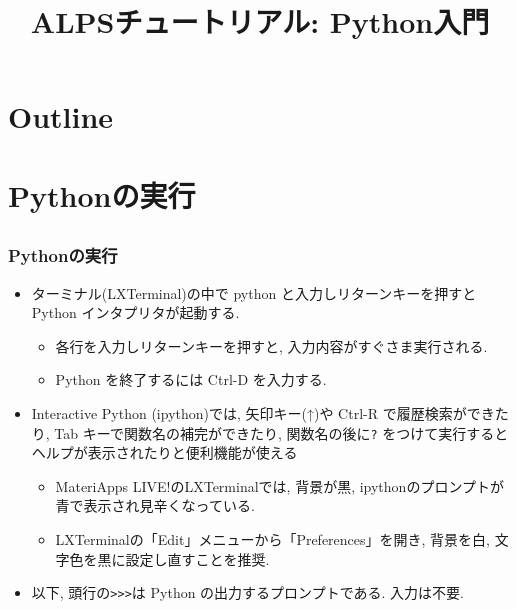 
\title{ALPSチュートリアル: Python入門}



\begin{frame}
  \titlepage
\end{frame}

\section*{Outline}
\begin{frame}
  \tableofcontents
\end{frame}

\section{Pythonの実行}

\subsection*{\redm\whiteb\greenb}
\begin{frame}[t, fragile]
\frametitle{Pythonの実行}
\begin{itemize}
\item ターミナル(LXTerminal)の中で python と入力しリターンキーを押すと Python インタプリタが起動する.
  \begin{itemize}
  \item 各行を入力しリターンキーを押すと, 入力内容がすぐさま実行される.
  \item Python を終了するには Ctrl-D を入力する.
  \end{itemize}
\item Interactive Python (ipython)では, 矢印キー(↑)や Ctrl-R で履歴検索ができたり, Tab キーで関数名の補完ができたり, 関数名の後に\verb|?| をつけて実行するとヘルプが表示されたりと便利機能が使える
  \begin{itemize}
  \item MateriApps LIVE!のLXTerminalでは, 背景が黒, ipythonのプロンプトが青で表示され見辛くなっている.
  \item LXTerminalの「Edit」メニューから「Preferences」を開き, 背景を白, 文字色を黒に設定し直すことを推奨.
  \end{itemize}
\item 以下, 頭行の\verb+>>>+は Python の出力するプロンプトである. 入力は不要.
\end{itemize}
\end{frame}

